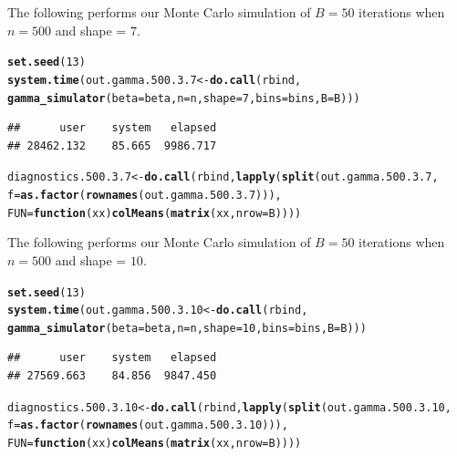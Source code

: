 \documentclass[11pt]{article}\usepackage[]{graphicx}\usepackage[]{color}
\makeatletter
\newcommand{\hlnum}[1]{\textcolor[rgb]{0.686,0.059,0.569}{#1}}%
\newcommand{\hlstd}[1]{\textcolor[rgb]{0.345,0.345,0.345}{#1}}%
\newcommand{\hlkwa}[1]{\textcolor[rgb]{0.161,0.373,0.58}{\textbf{#1}}}%
\newcommand{\hlkwb}[1]{\textcolor[rgb]{0.69,0.353,0.396}{#1}}%
\newcommand{\hlkwc}[1]{\textcolor[rgb]{0.333,0.667,0.333}{#1}}%
\newcommand{\hlkwd}[1]{\textcolor[rgb]{0.737,0.353,0.396}{\textbf{#1}}}%
\newenvironment{kframe}{%
 \def\at@end@of@kframe{}%
 \ifinner\ifhmode%
  \def\at@end@of@kframe{\end{minipage}}%
  \begin{minipage}{\columnwidth}%
 \fi\fi%
 \def\FrameCommand##1{\hskip\@totalleftmargin \hskip-\fboxsep
 \colorbox{shadecolor}{##1}\hskip-\fboxsep
     \hskip-\linewidth \hskip-\@totalleftmargin \hskip\columnwidth}%
 \MakeFramed {\advance\hsize-\width
   \@totalleftmargin\z@ \linewidth\hsize
   \@setminipage}}%
 {\par\unskip\endMakeFramed%
 \at@end@of@kframe}
\newenvironment{knitrout}{}{} %
\makeatother
\begin{document}
The following performs our Monte Carlo simulation of $B = 50$ iterations 
when $n = 500$ and shape = $7$.

\begin{knitrout}
\color{fgcolor}\begin{kframe}
\begin{alltt}
\hlkwd{set.seed}\hlstd{(}\hlnum{13}\hlstd{)}
\hlkwd{system.time}\hlstd{(out.gamma.500.3.7} \hlkwb{<-} \hlkwd{do.call}\hlstd{(rbind,}
  \hlkwd{gamma_simulator}\hlstd{(}\hlkwc{beta} \hlstd{= beta,} \hlkwc{n} \hlstd{= n,} \hlkwc{shape} \hlstd{=} \hlnum{7}\hlstd{,} \hlkwc{bins} \hlstd{= bins,} \hlkwc{B} \hlstd{= B)))}
\end{alltt}
\begin{verbatim}
##      user    system   elapsed 
## 28462.132    85.665  9986.717
\end{verbatim}
\begin{alltt}
\hlstd{diagnostics.500.3.7} \hlkwb{<-} \hlkwd{do.call}\hlstd{(rbind,} \hlkwd{lapply}\hlstd{(}\hlkwd{split}\hlstd{(out.gamma.500.3.7,}
  \hlkwc{f} \hlstd{=} \hlkwd{as.factor}\hlstd{(}\hlkwd{rownames}\hlstd{(out.gamma.500.3.7))),}
  \hlkwc{FUN} \hlstd{=} \hlkwa{function}\hlstd{(}\hlkwc{xx}\hlstd{)} \hlkwd{colMeans}\hlstd{(}\hlkwd{matrix}\hlstd{(xx,} \hlkwc{nrow} \hlstd{= B))))}
\end{alltt}
\end{kframe}
\end{knitrout}


The following performs our Monte Carlo simulation of $B = 50$ iterations 
when $n = 500$ and shape = $10$.

\begin{knitrout}
\color{fgcolor}\begin{kframe}
\begin{alltt}
\hlkwd{set.seed}\hlstd{(}\hlnum{13}\hlstd{)}
\hlkwd{system.time}\hlstd{(out.gamma.500.3.10} \hlkwb{<-} \hlkwd{do.call}\hlstd{(rbind,}
  \hlkwd{gamma_simulator}\hlstd{(}\hlkwc{beta} \hlstd{= beta,} \hlkwc{n} \hlstd{= n,} \hlkwc{shape} \hlstd{=} \hlnum{10}\hlstd{,} \hlkwc{bins} \hlstd{= bins,} \hlkwc{B} \hlstd{= B)))}
\end{alltt}
\begin{verbatim}
##      user    system   elapsed 
## 27569.663    84.856  9847.450
\end{verbatim}
\begin{alltt}
\hlstd{diagnostics.500.3.10} \hlkwb{<-} \hlkwd{do.call}\hlstd{(rbind,} \hlkwd{lapply}\hlstd{(}\hlkwd{split}\hlstd{(out.gamma.500.3.10,}
  \hlkwc{f} \hlstd{=} \hlkwd{as.factor}\hlstd{(}\hlkwd{rownames}\hlstd{(out.gamma.500.3.10))),}
  \hlkwc{FUN} \hlstd{=} \hlkwa{function}\hlstd{(}\hlkwc{xx}\hlstd{)} \hlkwd{colMeans}\hlstd{(}\hlkwd{matrix}\hlstd{(xx,} \hlkwc{nrow} \hlstd{= B))))}
\end{alltt}
\end{kframe}
\end{knitrout}
\end{document}
